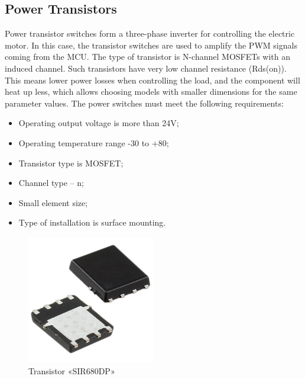 \subsection{Power Transistors}
Power transistor switches form a three-phase inverter for controlling the electric motor. In this case, the transistor switches are used to amplify the PWM signals coming from the MCU. The type of transistor is N-channel MOSFETs with an induced channel. Such transistors have very low channel resistance (Rds(on)). This means lower power losses when controlling the load, and the component will heat up less, which allows choosing models with smaller dimensions for the same parameter values. The power switches must meet the following requirements:
\begin{itemize}
	\item Operating output voltage is more than 24V;
	\item Operating temperature range -30 to +80;
	\item Transistor type is MOSFET;
	\item Channel type – n;
	\item Small element size;
	\item Type of installation is surface mounting.
\end{itemize}
\begin{figure}[H]
	\centering
	\includegraphics[width=0.5\textwidth]{Src/images/Transistir.png}
	\caption{Transistor «SIR680DP»}
	\label{SIR680DP}
\end{figure}





